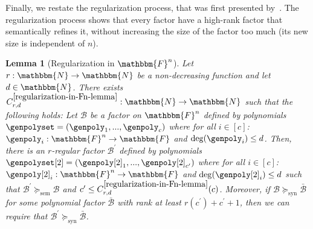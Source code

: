 \documentclass[10pt,a4paper]{article}
\newtheorem{lemma}[theorem]{Lemma}
\newcommand{\basefield}[0]{\mathbbm{F}}
\newcommand{\blocklength}[0]{n}
\newcommand{\field}[0]{\basefield^{\blocklength}}
\newcommand{\degree}[0]{d}
\newcommand{\funcdef}[3]{#1:#2\rightarrow#3}
\newcommand{\factor}[0]{\mathcal{B}}
\newcommand{\semrefine}[0]{\succeq_{\text{sem}}}
\newcommand{\synrefine}[0]{\succeq_{\text{syn}}}
\newcommand{\naturalnumbersset}[0]{\mathbbm{N}}
\newcommand{\rankfunc}[0]{{{{r}}}}
\begin{document}
Finally, we restate the regularization process, that was first presented by~\cite[Lemma 2.3]{green2007distribution}.
The regularization process shows that every factor have a high-rank factor that semantically refines it,
without increasing the size of the factor too much (its new size is independent of $\blocklength$).
\begin{lemma}[Regularization in $\field$]\label{regularization-in-Fn-lemma}
    Let $\funcdef{\rankfunc}{\naturalnumbersset}{\naturalnumbersset}$ be a non-decreasing function and let $\degree \in \naturalnumbersset$.
    There exists $\funcdef{C_{\rankfunc, \degree}^{\ref{regularization-in-Fn-lemma}}}{\naturalnumbersset}{\naturalnumbersset}$ such that the following holds:
    Let $\factor$ be a factor on $\field$ defined by polynomials $\genpolyset = (\genpoly_1,...,\genpoly_c)$ where for all $i \in [c]$: $\funcdef{\genpoly_i}{\field}{\basefield}$ and $\deg(\genpoly_i) \leq \degree$.
    Then, there is an $\rankfunc$-regular factor $\factor^\prime$ defined by polynomials $\genpolyset[2] = (\genpoly[2]_1,...,\genpoly[2]_{c^\prime})$ where
    for all $i \in [c]$: $\funcdef{\genpoly[2]_i}{\field}{\basefield}$ and $\deg(\genpoly[2]_i) \leq \degree$ such that
    $\factor^\prime \semrefine \factor$ and $c^\prime \leq C_{\rankfunc, \degree}^{\ref{regularization-in-Fn-lemma}}(c)$.
    \newline
    Moreover, if $\factor \synrefine \bar{\factor}$ for some polynomial factor $\bar{\factor}$ with rank at least $\rankfunc(c^\prime)+c^\prime+1$,
    then we can require that $\factor^\prime \synrefine \bar{\factor}$.
\end{lemma}
\end{document}

